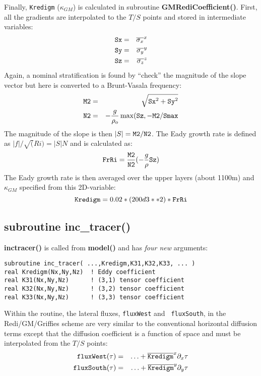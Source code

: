 \documentclass[12pt]{article}
\begin{document}
Finally, {\tt Kredigm} ($\kappa_{GM}$) is calculated in subroutine
{\bf GMRediCoefficient()}. First, all the gradients are interpolated
to the $T/S$ points and stored in intermediate variables:
\begin{eqnarray*}
\mbox{\tt Sx} & = & \overline{ \sigma_x }^x \\
\mbox{\tt Sy} & = & \overline{ \sigma_y }^y \\
\mbox{\tt Sz} & = & \overline{ \sigma_z }^z
\end{eqnarray*}
Again, a nominal stratification is found by ``check'' the magnitude of
the slope vector but here is converted to a Brunt-Vasala frequency:
\begin{eqnarray*}
{\tt M2} & = & \sqrt{ {\tt Sx}^2 + {\tt Sy}^2} \\
{\tt N2} & = & - \frac{g}{\rho_o} \max ( {\tt Sz} , -{\tt M2 / Smax}
\end{eqnarray*}
The magnitude of the slope is then $|S| = {\tt M2}/{\tt N2}$. The Eady
growth rate is defined as $|f|/\sqrt(Ri) = |S| N$ and is calculated
as:
\begin{displaymath}
{\tt FrRi} = \frac{\tt M2}{\tt N2} ( - \frac{g}{\rho} {\tt Sz} )
\end{displaymath}
The Eady growth rate is then averaged over the upper layers (about
1100m) and $\kappa_{GM}$ specified from this 2D-variable:
\begin{displaymath}
{\tt Kredigm} = 0.02 * (200d3 **2) * {\tt FrRi}
\end{displaymath}

\subsection{subroutine inc\_tracer()}

{\bf inc\-tracer()} is called from {\bf model()} and has {\em four
new} arguments:
\begin{verbatim}
subroutine inc_tracer( ...,Kredigm,K31,K32,K33, ... )
real Kredigm(Nx,Ny,Nz)  ! Eddy coefficient
real K31(Nx,Ny,Nz)      ! (3,1) tensor coefficient
real K32(Nx,Ny,Nz)      ! (3,2) tensor coefficient
real K33(Nx,Ny,Nz)      ! (3,3) tensor coefficient
\end{verbatim}

Within the routine, the lateral fluxes, {\tt fluxWest} and {\tt
fluxSouth}, in the Redi/GM/Griffies scheme are very similar to the
conventional horizontal diffusion terms except that the diffusion
coefficient is a function of space and must be interpolated from the
$T/S$ points:
\begin{eqnarray*}
{\tt fluxWest}(\tau) & = & \ldots +
\overline{\tt Kredigm}^x \partial_x \tau \\
{\tt fluxSouth}(\tau) & = & \ldots +
\overline{\tt Kredigm}^y \partial_y \tau
\end{eqnarray*}
\end{document}
